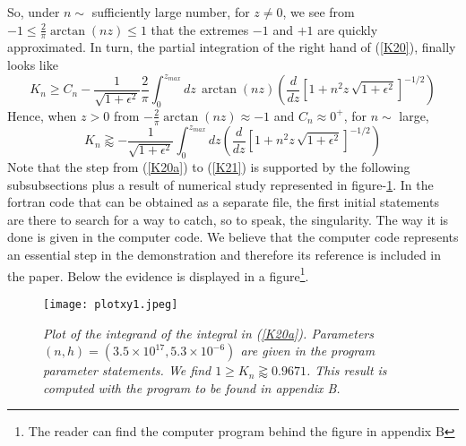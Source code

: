 \documentclass{appolb}
\begin{document}
So, under $n \sim$ sufficiently large number, for $z\neq 0$, we see from $-1\leq \frac{2}{\pi} \arctan(nz) \leq 1$ that the extremes $-1$ and $+1$ are quickly approximated. 
In turn, the partial integration of the right hand of (\ref{K20}), finally looks like
\begin{equation}\label{K20a}
K_n \geq C_n -\frac{1}{\sqrt{1+\epsilon^2}}\frac{2}{\pi} \int_0^{z_{max}}dz\, \arctan(nz)\left( \frac{d}{dz}\left[ 1+n^2z\,\sqrt{1+\epsilon^2} \right]^{-1/2} \right)
\end{equation}
Hence,  when $z > 0$ from $-\frac{2}{\pi} \arctan(nz) \approx -1$ and $C_n \approx 0^{+}$, for $n \sim$ large,
\begin{equation}\label{K21}
K_n \gtrapprox -\frac{1}{\sqrt{1+\epsilon^2}} \int_0^{z_{max}}dz \left( \frac{d}{dz}\left[ 1+n^2z\,\sqrt{1+\epsilon^2} \right]^{-1/2} \right)
\end{equation}
Note that the step from (\ref{K20a}) to (\ref{K21}) is supported by the following subsubsections plus a result of numerical study represented in figure-\ref{fig1}. In the fortran code that can be obtained as a separate file, the first initial statements are there to search for a way to catch, so to speak, the singularity. The way it is done is given in the computer code.
We believe that the computer code represents an essential step in the demonstration and therefore its reference is included in the paper. 
Below the evidence is displayed in a figure\footnote{The reader can find the computer program behind the figure in appendix B}.
\newpage
\begin{figure}
\center
\caption{{\it Plot of the integrand of the integral in (\ref{K20a}). Parameters $(n,h)=(3.5\times 10^{17},5.3\times 10^{-6})$ are given in the program parameter statements. We find $1\geq K_n\gtrapprox 0.9671$. This result is computed with the program to be found in appendix B.}}
\texttt{[image: plotxy1.jpeg]}
\label{fig1}
\end{figure}
\end{document}
